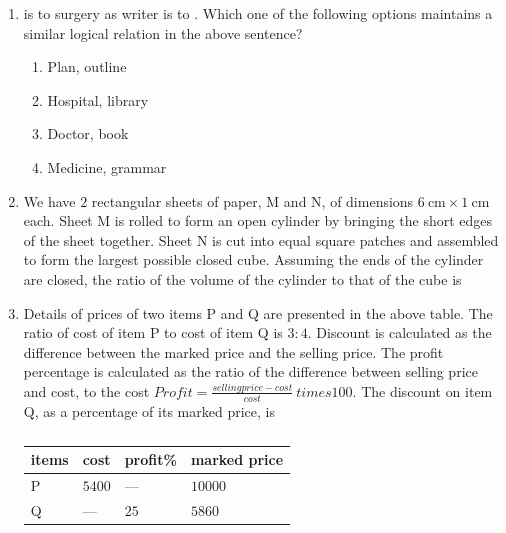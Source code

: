 \documentclass[journal,12pt,onecolumn]{IEEEtran}
\theoremstyle{remark}
\begin{document}
\begin{enumerate}
		\item \underline{\hspace{2cm}} is to surgery as writer is to \underline{\hspace{2cm}}. Which one of the following options maintains a similar logical relation in the above sentence?
		
		\hfill{}
		
		\begin{enumerate}
			\item Plan, outline
			\item Hospital, library
			\item Doctor, book
			\item Medicine, grammar
		\end{enumerate}
		
		\item We have $2$ rectangular sheets of paper, M and N, of dimensions $6~\text{cm} \times 1~\text{cm}$ each. Sheet M is rolled to form an open cylinder by bringing the short edges of the sheet together. Sheet N is cut into equal square patches and assembled to form the largest possible closed cube. Assuming the ends of the cylinder are closed, the ratio of the volume of the cylinder to that of the cube is
		
		\hfill{}
		
		\begin{enumerate}
		\end{enumerate}
		
		\item Details of prices of two items P and Q are presented in the above table. The ratio of cost of item P to cost of item Q is $3:4$. Discount is calculated as the difference between the marked price and the selling price. The profit percentage is calculated as the ratio of the difference between selling price and cost, to the cost $Profit  = \frac{selling price-cost}{cost} \ times100$. 
		The discount on item Q, as a percentage of its marked price, is
		
		\hfill{}
		
		\begin{table}[h!]
			\centering
			\begin{tabular}{|l|l|l|l|}
				\hline
				 items  & cost & profit\% & marked price \\ %
				\hline
				P & $5400$ & ---& $10000$ \\
				\hline
				Q & --- & $25$ & $5860$ \\
				\hline
			\end{tabular}
			\caption*{}
			\label{tab:Q7}
		\end{table}
		

\end{enumerate}
\end{document}
